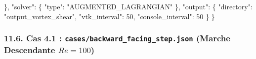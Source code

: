 \documentclass[
  french,
]{article}
\newenvironment{Shaded}{}{}
\newcommand{\DataTypeTok}[1]{\textcolor[rgb]{0.56,0.13,0.00}{#1}}
\newcommand{\DecValTok}[1]{\textcolor[rgb]{0.25,0.63,0.44}{#1}}
\newcommand{\FunctionTok}[1]{\textcolor[rgb]{0.02,0.16,0.49}{#1}}
\newcommand{\StringTok}[1]{\textcolor[rgb]{0.25,0.44,0.63}{#1}}
\begin{document}
\begin{Shaded}
\begin{Highlighting}[]
  \FunctionTok{\},}
  \DataTypeTok{"solver"}\FunctionTok{:} \FunctionTok{\{} \DataTypeTok{"type"}\FunctionTok{:} \StringTok{"AUGMENTED\_LAGRANGIAN"} \FunctionTok{\},}
  \DataTypeTok{"output"}\FunctionTok{:} \FunctionTok{\{} \DataTypeTok{"directory"}\FunctionTok{:} \StringTok{"output\_vortex\_shear"}\FunctionTok{,} \DataTypeTok{"vtk\_interval"}\FunctionTok{:} \DecValTok{50}\FunctionTok{,} \DataTypeTok{"console\_interval"}\FunctionTok{:} \DecValTok{50} \FunctionTok{\}}
\FunctionTok{\}}
\end{Highlighting}
\end{Shaded}

\subsubsection{\texorpdfstring{11.6. Cas 4.1 :
\texttt{cases/backward\_facing\_step.json} (Marche Descendante
\(Re=100\))}{11.6. Cas 4.1 : cases/backward\_facing\_step.json (Marche Descendante Re=100)}}\label{cas-4.1-casesbackward_facing_step.json-marche-descendante-re100}
\end{document}
